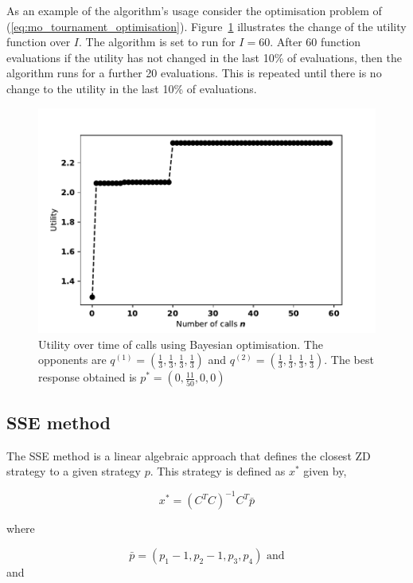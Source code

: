 As an example of the algorithm's usage consider the optimisation problem of
(\ref{eq:mo_tournament_optimisation}). Figure~\ref{bayesian_example} illustrates
the change of the utility function over \(I\). The algorithm is set to run for
\(I=60\). After 60 function evaluations if the utility has not changed in the
last 10\% of evaluations, then the algorithm runs for a further 20 evaluations.
This is repeated until there is no change to the utility in the last 10\% of
evaluations.

\begin{figure}[!htbp]
    \begin{center}
    \includegraphics[width=.65\linewidth]{src/chapters/05/paper/memory-size-in-the-prisoners-dilemma/img/bayesian_example.pdf}
    \end{center}
    \caption{Utility over time of calls using Bayesian optimisation. The
    opponents are \(q^{(1)} = (\frac{1}{3}, \frac{1}{3}, \frac{1}{3},
    \frac{1}{3})\) and \(q^{(2)} = (\frac{1}{3}, \frac{1}{3},
    \frac{1}{3}, \frac{1}{3})\). The best response obtained is \(p^* = (0, \frac{11}{50}, 0, 0)\)}
    \label{bayesian_example}
\end{figure}

\subsection{SSE method}\label{section:sse}

The SSE method is a linear algebraic approach that defines the closest ZD
strategy to a given strategy \(p\). This strategy is defined as \(x^*\) given
by,

\begin{equation}\label{eqn:x_star_formula}
    x^* = {\left(C^{T}C\right)}^{-1}C^{T}\bar{p}
\end{equation}

where

\[\bar{p}=(p_1 - 1, p_2 - 1, p_3, p_4) \text{ and}\] and

